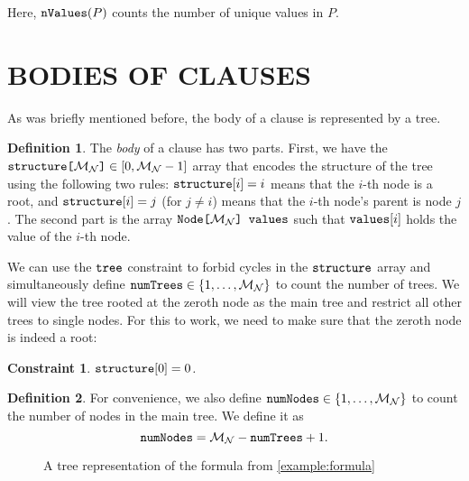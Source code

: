 \documentclass[letterpaper]{article}
\newtheorem{constraint}{Constraint}
\theoremstyle{definition}
\newtheorem{definition}{Definition}
\newcommand{\variable}[1]{\texttt{\textup{#1}}}
\newcommand{\arrayd}[3]{\variable{{#1}[}{#2}\variable{]} \in {#3}}
\newcommand{\arrayt}[3]{\variable{{#3}[}{#2}\variable{] {#1}}}
\newcommand{\maxNumNodes}{\mathcal{M}_{\mathcal{N}}}
\begin{document}
Here, $\variable{nValues}(P)$ counts the number of unique values in $P$.

\section{BODIES OF CLAUSES} \label{sec:bodies}

As was briefly mentioned before, the body of a clause is represented by a tree.

\begin{definition}
  The \emph{body} of a clause has two parts. First, we have the
  $\arrayd{structure}{\maxNumNodes{}}{[0, \maxNumNodes{} - 1]}$ array that
  encodes the structure of the tree using the following two rules:
  $\variable{structure}[i] = i$ means that the $i$-th node is a root, and
  $\variable{structure}[i] = j$ (for $j \ne i$) means that the $i$-th node's
  parent is node $j$. The second part is the array
  $\arrayt{values}{\maxNumNodes{}}{Node}$ such that $\variable{values}[i]$ holds
  the value of the $i$-th node.
\end{definition}

We can use the $\variable{tree}$ constraint \citep{DBLP:conf/cp/FagesL11} to
forbid cycles in the $\variable{structure}$ array and simultaneously define
$\variable{numTrees} \in \{ 1, \dots, \maxNumNodes{} \}$ to count the number of
trees. We will view the tree rooted at the zeroth node as the main tree and
restrict all other trees to single nodes. For this to work, we need to make sure
that the zeroth node is indeed a root:

\begin{constraint}
  $\variable{structure}[0] = 0$.
\end{constraint}

\begin{definition}
  For convenience, we also define $\variable{numNodes} \in \{ 1, \dots,
  \maxNumNodes{} \}$ to count the number of nodes in the main tree. We define it
  as
  \[
    \variable{numNodes} = \maxNumNodes{} - \variable{numTrees} + 1.
  \]
\end{definition}

\begin{figure}
  \centering
  \caption{A tree representation of the formula from \cref{example:formula}}
  \label{fig:example_tree}
\end{figure}
\end{document}
